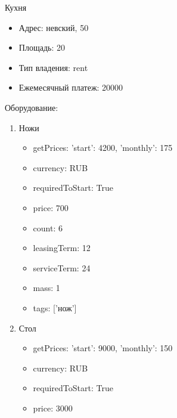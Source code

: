 \documentclass[a4paper,12pt]{article}
\begin{document}
    Кухня

    \begin{itemize}
    \item Адрес: невский, 50
    \item Площадь: 20
    \item Тип владения: rent
    \item Ежемесячный платеж: 20000
    \end{itemize}
    
    Оборудование:
    \begin{enumerate}
      
      \item Ножи
        \begin{itemize}
        
          \item getPrices: {'start': 4200, 'monthly': 175}
        
          \item currency: RUB
        
          \item requiredToStart: True
        
          \item price: 700
        
          \item count: 6
        
          \item leasingTerm: 12
        
          \item serviceTerm: 24
        
          \item mass: 1
        
          \item tags: ['нож']
        
        \end{itemize}
      
      \item Стол
        \begin{itemize}
        
          \item getPrices: {'start': 9000, 'monthly': 150}
        
          \item currency: RUB
        
          \item requiredToStart: True
        
          \item price: 3000
        

\end{itemize}
\end{enumerate}
\end{document}
